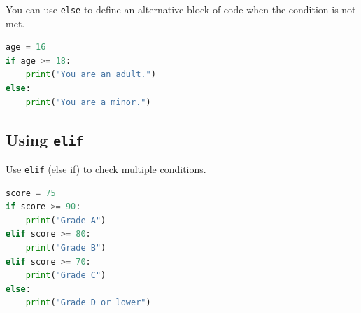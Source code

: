 \documentclass{article}
\begin{document}
You can use \texttt{else} to define an alternative block of code when the condition is not met.

\begin{lstlisting}[language=Python]
age = 16
if age >= 18:
    print("You are an adult.")
else:
    print("You are a minor.")
\end{lstlisting}

\subsection{Using \texttt{elif}}

Use \texttt{elif} (else if) to check multiple conditions.

\begin{lstlisting}[language=Python]
score = 75
if score >= 90:
    print("Grade A")
elif score >= 80:
    print("Grade B")
elif score >= 70:
    print("Grade C")
else:
    print("Grade D or lower")
\end{lstlisting}
\end{document}
